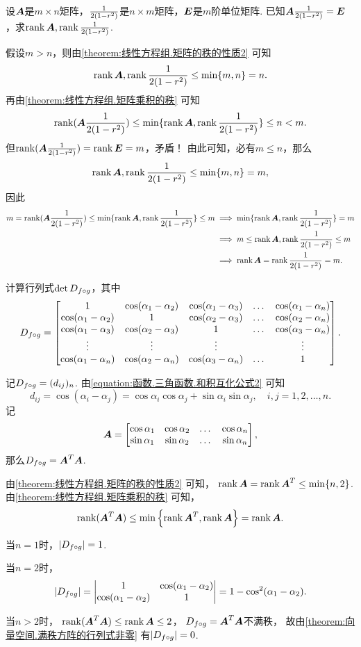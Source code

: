 \begin{example}
设\(\boldsymbol{A}\)是\(m \times n\)矩阵，\(\frac{1}{2(1-r^2)}\)是\(n \times m\)矩阵，\(\boldsymbol{E}\)是\(m\)阶单位矩阵.
已知\(\boldsymbol{A}\frac{1}{2(1-r^2)} = \boldsymbol{E}\)，求\(\rank\boldsymbol{A},\rank\frac{1}{2(1-r^2)}\).
\begin{solution}
假设\(m > n\)，则由\cref{theorem:线性方程组.矩阵的秩的性质2} 可知\[
\rank\boldsymbol{A},\rank\frac{1}{2(1-r^2)} \leq \min\{m,n\} = n.
\]再由\cref{theorem:线性方程组.矩阵乘积的秩} 可知\[
\rank(\boldsymbol{A}\frac{1}{2(1-r^2)}) \leq \min\{\rank\boldsymbol{A},\rank\frac{1}{2(1-r^2)}\} \leq n < m.
\]但\(\rank(\boldsymbol{A}\frac{1}{2(1-r^2)}) = \rank\boldsymbol{E} = m\)，矛盾！
由此可知，必有\(m \leq n\)，那么\[
\rank\boldsymbol{A},\rank\frac{1}{2(1-r^2)} \leq \min\{m,n\} = m,
\]因此\begin{align*}
m = \rank(\boldsymbol{A}\frac{1}{2(1-r^2)}) \leq \min\{\rank\boldsymbol{A},\rank\frac{1}{2(1-r^2)}\} \leq m
&\implies
\min\{\rank\boldsymbol{A},\rank\frac{1}{2(1-r^2)}\} = m \\
&\implies
m \leq \rank\boldsymbol{A},\rank\frac{1}{2(1-r^2)} \leq m \\
&\implies \rank\boldsymbol{A}=\rank\frac{1}{2(1-r^2)}=m.
\end{align*}
\end{solution}
\end{example}

\begin{example}
计算行列式\(\det D_{f \circ g}\)，其中\[
D_{f \circ g} = \begin{bmatrix}
	1 & \cos(\alpha_1-\alpha_2) & \cos(\alpha_1-\alpha_3) & \dots & \cos(\alpha_1-\alpha_n) \\
	\cos(\alpha_1-\alpha_2) & 1 & \cos(\alpha_2-\alpha_3) & \dots & \cos(\alpha_2-\alpha_n) \\
	\cos(\alpha_1-\alpha_3) & \cos(\alpha_2-\alpha_3) & 1 & \dots & \cos(\alpha_3-\alpha_n) \\
	\vdots & \vdots & \vdots & & \vdots \\
	\cos(\alpha_1-\alpha_n) & \cos(\alpha_2-\alpha_n) & \cos(\alpha_3-\alpha_n) & \dots & 1
\end{bmatrix}.
\]
\begin{solution}
记\(D_{f \circ g} = (d_{ij})_n\).
由\cref{equation:函数.三角函数.和积互化公式2} 可知\[
	d_{ij} = \cos(\alpha_i-\alpha_j)
	= \cos\alpha_i\cos\alpha_j+\sin\alpha_i\sin\alpha_j,
	\quad i,j=1,2,\dotsc,n.
\]
记\[
	\boldsymbol{A} = \begin{bmatrix}
		\cos\alpha_1 & \cos\alpha_2 & \dots & \cos\alpha_n \\
		\sin\alpha_1 & \sin\alpha_2 & \dots & \sin\alpha_n
	\end{bmatrix},
\]那么\(D_{f \circ g} = \boldsymbol{A}^T \boldsymbol{A}\).

由\cref{theorem:线性方程组.矩阵的秩的性质2} 可知，
\(\rank\boldsymbol{A} = \rank\boldsymbol{A}^T \leq \min\{n,2\}\).
由\cref{theorem:线性方程组.矩阵乘积的秩} 可知，\[
	\rank(\boldsymbol{A}^T\boldsymbol{A}) \leq \min\left\{\rank\boldsymbol{A}^T,\rank\boldsymbol{A}\right\} = \rank\boldsymbol{A}.
\]

当\(n=1\)时，\(\abs{D_{f \circ g}}=1\).

当\(n=2\)时，\[
	\abs{D_{f \circ g}}
	= \begin{vmatrix}
		1 & \cos(\alpha_1-\alpha_2) \\
		\cos(\alpha_1-\alpha_2) & 1
	\end{vmatrix}
	= 1 - \cos^2(\alpha_1-\alpha_2).
\]

当\(n>2\)时，
\(\rank(\boldsymbol{A}^T\boldsymbol{A}) \leq \rank\boldsymbol{A} \leq2\)，
\(D_{f \circ g} = \boldsymbol{A}^T \boldsymbol{A}\)不满秩，
故由\cref{theorem:向量空间.满秩方阵的行列式非零} 有\(\abs{D_{f \circ g}}=0\).
\end{solution}
\end{example}

